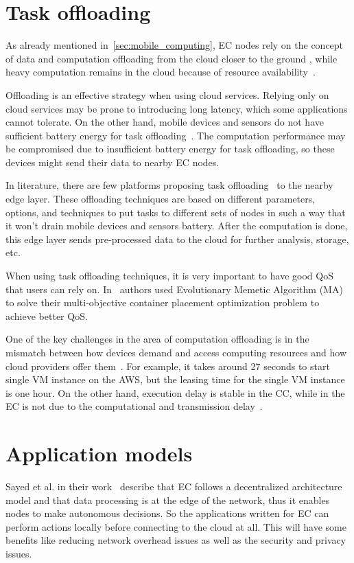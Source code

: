 \section{Task offloading}\label{sec:task_offloading}
%
As already mentioned in~\ref{sec:mobile_computing}, EC nodes rely on the concept of data and computation offloading from the cloud closer to the ground \cite{KhuneP19}, while heavy computation remains in the cloud because of resource availability~\cite{NingLSY20}. 

Offloading is an effective strategy when using cloud services. Relying only on cloud services may be prone to introducing long latency, which some applications cannot tolerate. On the other hand, mobile devices and sensors do not have sufficient battery energy for task offloading~\cite{MaoZL16}. The computation performance may be compromised due to insufficient battery energy for task offloading, so these devices might send their data to nearby EC nodes.

In literature, there are few platforms proposing task offloading~\cite{ShiHPANZ14, KhuneP19, ChenHLLW15, LinLJL19, JiangCGZW19, MaoZL16} to the nearby edge layer. These offloading techniques are based on different parameters, options, and techniques to put tasks to different sets of nodes in such a way that it won't drain mobile devices and sensors battery. After the computation is done, this edge layer sends pre-processed data to the cloud for further analysis, storage, etc.

When using task offloading techniques, it is very important to have good QoS that users can rely on. In~\cite{SamiM20} authors used Evolutionary Memetic Algorithm (MA) to solve their multi-objective container placement optimization problem to achieve better QoS.

One of the key challenges in the area of computation offloading is in the mismatch between how devices demand and access computing resources and how cloud providers offer them~\cite{ShiHPANZ14}. For example, it takes around 27 seconds to start single VM instance on the AWS, but the leasing time for the single VM instance is one hour. On the other hand, execution delay is stable in the CC, while in the EC is not due to the computational and transmission delay~\cite{WangZMHNW18}.
%
%
\section{Application models}\label{sec:applications}
%
Sayed et al. in their work~\cite{El-SayedSPPGML18} describe that EC follows a decentralized architecture model and that data processing is at the edge of the network, thus it enables nodes to make autonomous decisions.  So the applications written for EC can perform actions locally before connecting to the cloud at all. This will have some benefits like reducing network overhead issues as well as the security and privacy issues. 

